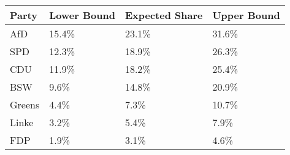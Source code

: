 \begin{tabular}{llll}
  \hline
Party & Lower Bound & Expected Share & Upper Bound \\ 
  \hline
AfD & 15.4\% & 23.1\% & 31.6\% \\ 
  SPD & 12.3\% & 18.9\% & 26.3\% \\ 
  CDU & 11.9\% & 18.2\% & 25.4\% \\ 
  BSW & 9.6\% & 14.8\% & 20.9\% \\ 
  Greens & 4.4\% & 7.3\% & 10.7\% \\ 
  Linke & 3.2\% & 5.4\% & 7.9\% \\ 
  FDP & 1.9\% & 3.1\% & 4.6\% \\ 
   \hline
\end{tabular}
